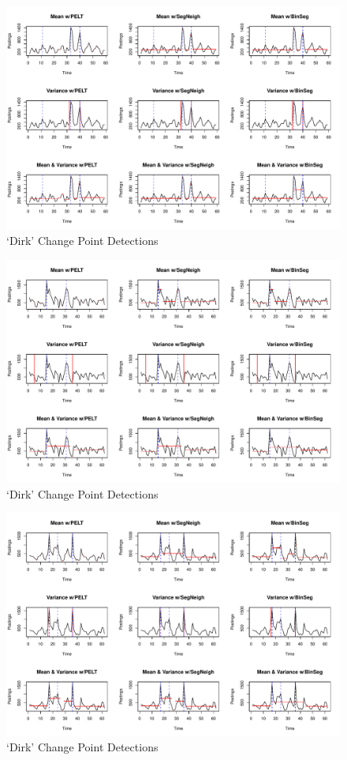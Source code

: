 \documentclass{uvamscse}	%
\begin{document}
\begin{figure}[h]
    \includegraphics[width=\textwidth]{figures/rabobankresults}
    \caption{`Dirk' Change Point Detections}
    \label{fig:rabobank}
\end{figure}


\begin{figure}[h]
    \includegraphics[width=\textwidth]{figures/tele2results}
    \caption{`Dirk' Change Point Detections}
    \label{fig:tele2}
\end{figure}


\begin{figure}[h]
    \includegraphics[width=\textwidth]{figures/uwvresults}
    \caption{`Dirk' Change Point Detections}
    \label{fig:uwv}
\end{figure}
\end{document}
